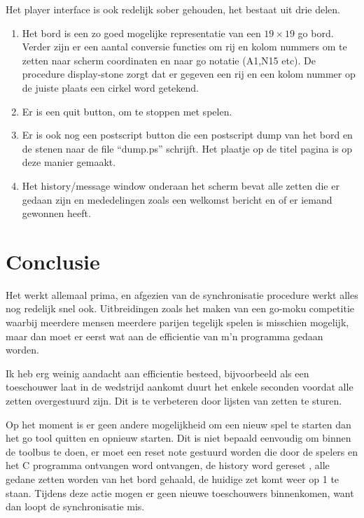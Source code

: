 Het player interface is ook redelijk sober gehouden, het bestaat
uit drie delen.
\begin{enumerate}
\item Het bord is een zo goed mogelijke representatie van een $19\times 19$
go bord. Verder zijn er een aantal conversie functies om rij en kolom 
nummers om te zetten naar scherm coordinaten en naar go notatie (A1,N15 etc).
De procedure display-stone zorgt dat er gegeven een rij en een kolom
nummer op de juiste plaats een cirkel word getekend.
\item Er is een quit button, om te stoppen met spelen.
\item Er is ook nog een postscript button die een postscript dump
van het bord en de stenen naar de file ``dump.ps'' schrijft. Het
plaatje op de titel pagina is op deze manier gemaakt.
\item Het history/message window onderaan het scherm bevat alle zetten die
er gedaan zijn en mededelingen zoals een welkomst bericht en of er iemand
gewonnen heeft.
\end{enumerate}

\section{Conclusie}
Het werkt allemaal prima, en afgezien van de synchronisatie procedure
werkt alles nog redelijk snel ook. Uitbreidingen zoals het maken van
een go-moku competitie waarbij meerdere mensen meerdere parijen tegelijk
spelen is misschien mogelijk, maar dan moet er eerst wat aan de
efficientie van m'n programma gedaan worden.

Ik heb erg weinig aandacht aan efficientie besteed, bijvoorbeeld als een
toeschouwer laat in de wedstrijd aankomt duurt het enkele seconden voordat
alle zetten overgestuurd zijn. Dit is te verbeteren door
lijsten van zetten te sturen.

Op het moment is er geen andere mogelijkheid om een nieuw spel te starten
dan het go tool quitten en opnieuw starten. Dit is niet bepaald eenvoudig
om binnen de toolbus te doen, er moet een reset note gestuurd worden die
door de spelers en het C programma ontvangen word ontvangen,
de history word gereset , alle gedane zetten worden van het bord gehaald, de
huidige zet komt weer op 1 te staan. Tijdens deze actie mogen er geen
nieuwe toeschouwers binnenkomen, want dan loopt de synchronisatie mis.




